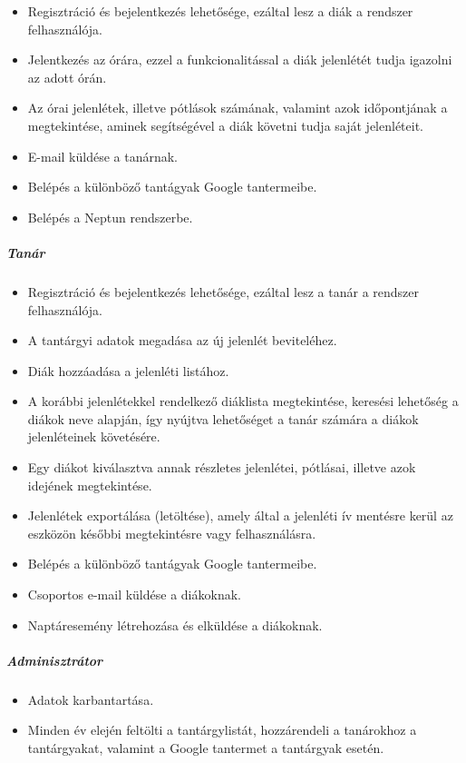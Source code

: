 \documentclass[12pt]{article}
\numberwithin{figure}{section}
\numberwithin{equation}{section}
\begin{document}
\begin{itemize}
	\item {Regisztráció és bejelentkezés lehetősége, ezáltal lesz a diák a rendszer felhasználója.}
	\item {Jelentkezés az órára, ezzel a funkcionalitással a diák jelenlétét tudja igazolni az adott órán.}
	\item {Az órai jelenlétek, illetve pótlások számának, valamint azok időpontjának a megtekintése, aminek segítségével a diák követni tudja saját jelenléteit.}
	\item {E-mail küldése a tanárnak.}
	\item {Belépés a különböző tantágyak Google tantermeibe.}
	\item {Belépés a Neptun rendszerbe.}\\
\end{itemize}

\subparagraph*{Tanár}
\begin{itemize}
	\item {Regisztráció és bejelentkezés lehetősége, ezáltal lesz a tanár a rendszer felhasználója.}
	\item {A tantárgyi adatok megadása az új jelenlét beviteléhez.}
	\item {Diák hozzáadása a jelenléti listához.}
	\item {A korábbi jelenlétekkel rendelkező diáklista megtekintése, keresési lehetőség a diákok neve alapján, így nyújtva lehetőséget a tanár számára a diákok jelenléteinek követésére.}
	\item {Egy diákot kiválasztva annak részletes jelenlétei, pótlásai, illetve azok idejének megtekintése.}
	\item {Jelenlétek exportálása (letöltése), amely által a jelenléti ív mentésre kerül az eszközön későbbi megtekintésre vagy felhasználásra.}
	\item {Belépés a különböző tantágyak Google tantermeibe.}
	\item {Csoportos e-mail küldése a diákoknak.}
	\item {Naptáresemény létrehozása és elküldése a diákoknak.}\\
\end{itemize}

\subparagraph*{Adminisztrátor}

\begin{itemize}
	\item {Adatok karbantartása.}
	\item {Minden év elején feltölti a tantárgylistát, hozzárendeli a tanárokhoz a tantárgyakat, valamint a Google tantermet a tantárgyak esetén.}\\
\end{itemize}
\end{document}
